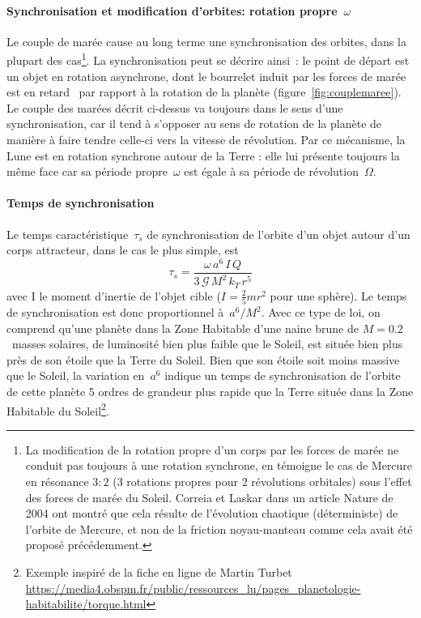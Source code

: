 \sk
\paragraph{Synchronisation et modification d'orbites: rotation propre~$\omega$} Le couple de marée cause au long terme une synchronisation des orbites, dans la plupart des cas\footnote{La modification de la rotation propre d'un corps par les forces de marée ne conduit pas toujours à une rotation synchrone, en témoigne le cas de Mercure en résonance $3:2$ (3 rotations propres pour 2 révolutions orbitales) sous l'effet des forces de marée du Soleil. Correia et Laskar dans un article Nature de 2004 ont montré que cela résulte de l'évolution chaotique (déterministe) de l'orbite de Mercure, et non de la friction noyau-manteau comme cela avait été proposé précédemment.}. La synchronisation peut se décrire ainsi~: le point de départ est un objet en rotation asynchrone, dont le bourrelet induit par les forces de marée est \og en retard \fg~par rapport à la rotation de la planète (figure~\ref{fig:couplemaree}). Le couple des marées décrit ci-dessus va toujours dans le sens d'une synchronisation, car il tend à s'opposer au sens de rotation de la planète de manière à faire tendre celle-ci vers la vitesse de révolution. Par ce mécanisme, la Lune est en rotation synchrone autour de la Terre : elle lui présente toujours la même face car sa période propre~$\omega$ est égale à sa période de révolution~$\Omega$.

\sk
\paragraph{Temps de synchronisation} Le temps caractéristique~$\tau_s$ de synchronisation de l'orbite d'un objet autour d'un corps attracteur, dans le cas le plus simple, est
\[ \tau_s = \frac{\omega \, a^6 \, I \, Q}{3 \, \mathcal{G} \, M^2 \, k_T \, r^5} \]
\noindent avec I le moment d'inertie de l'objet cible ($I=\frac{2}{5} m r^2$ pour une sphère). Le temps de synchronisation est donc proportionnel à~$a^6 / M^2$. Avec ce type de loi, on comprend qu'une planète dans la Zone Habitable d'une naine brune de $M = 0.2$~masses solaires, de luminosité bien plus faible que le Soleil, est située bien plus près de son étoile que la Terre du Soleil. Bien que son étoile soit moins massive que le Soleil, la variation en~$a^6$ indique un temps de synchronisation de l'orbite de cette planète 5 ordres de grandeur plus rapide que la Terre située dans la Zone Habitable du Soleil\footnote{Exemple inspiré de la fiche en ligne de Martin Turbet \url{https://media4.obspm.fr/public/ressources_lu/pages_planetologie-habitabilite/torque.html}}. 
